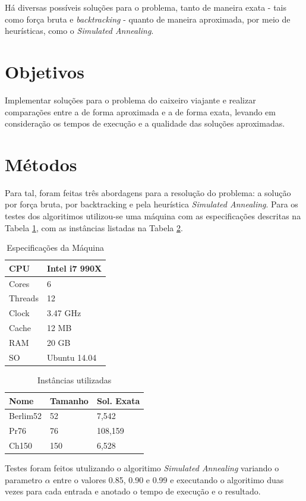 \documentclass[a4paper, 12pt]{article}
\begin{document}
Há diversas possíveis soluções para o problema, tanto de maneira exata - tais como força bruta e \textit{backtracking} - quanto de maneira aproximada, por meio de heurísticas, como o \textit{Simulated Annealing}.

\newpage
\section{Objetivos}

Implementar soluções para o problema do caixeiro viajante e realizar comparações entre a de forma aproximada e a de forma exata, levando em consideração os tempos de execução e a qualidade das soluções aproximadas.

\newpage
\section{Métodos}

Para tal, foram feitas três abordagens para a resolução do problema: a solução por força bruta, por backtracking e pela heurística \textit{Simulated Annealing}.
Para os testes dos algoritimos utilizou-se uma máquina com as especificações descritas na Tabela \ref{tab:cpu}, com as instâncias listadas na Tabela \ref{tab:input}.

\begin{table}[h]

\label{tab:cpu}
\centering
\begin{tabular}{| l |  l |}
 \hline
 CPU & Intel i7 990X \\
 \hline
 Cores & 6\\
 \hline
 Threads & 12\\
 \hline
 Clock & 3.47 GHz\\
 \hline
 Cache& 12 MB \\
 \hline
 RAM & 20 GB \\
 \hline
 SO & Ubuntu 14.04 \\
 \hline
\end{tabular}
\caption{Especificações da Máquina}
\end{table}

\begin{table}[h]

\label{tab:input}
\centering
\begin{tabular}{| l |  l | l | }
 \hline
 \textbf{Nome} & \textbf{Tamanho} & \textbf{Sol. Exata}\\\hline
 Berlim52      & 52               & 7,542               \\\hline
 Pr76          & 76               & 108,159             \\\hline
 Ch150         & 150              & 6,528               \\\hline
\end{tabular}
\caption{Instâncias utilizadas\protect\footnotemark}
\end{table}
Testes foram feitos utulizando o algoritimo \textit{Simulated Annealing} variando o parametro $\alpha$
entre o valores 0.85, 0.90 e 0.99 e executando o algoritimo duas vezes para cada entrada e anotado o tempo de execução e o resultado.
\end{document}
